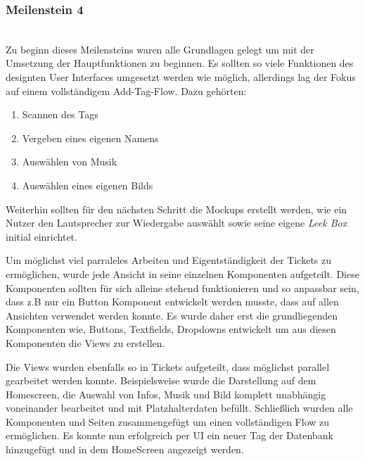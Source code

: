 \documentclass[10pt, a4paper]{article}
\begin{document}
\subsubsection*{Meilenstein 4} $~$ \\
Zu beginn dieses Meilensteins waren alle Grundlagen gelegt um mit der Umsetzung der Hauptfunktionen zu beginnen.
Es sollten so viele Funktionen des designten User Interfaces umgesetzt werden wie möglich, allerdings lag der Fokus auf einem vollständigem \glqq Add-Tag-Flow\grqq.
Dazu gehörten:
\begin{enumerate}
  \item Scannen des Tags
  \item Vergeben eines eigenen Namens
  \item Auswählen von Musik
  \item Auswählen eines eigenen Bilds
\end{enumerate}
Weiterhin sollten für den nächsten Schritt die Mockups erstellt werden, wie ein Nutzer den Lautsprecher zur Wiedergabe auswählt sowie seine eigene \textit{Leek Box} initial einrichtet.

Um möglichst viel parraleles Arbeiten und Eigentständigkeit der Tickets zu ermöglichen, wurde jede Ansicht in seine einzelnen Komponenten aufgeteilt.
Diese Komponenten sollten für sich alleine stehend funktionieren und so anpassbar sein, dass z.B nur ein Button Komponent entwickelt werden musste, dass auf
allen Ansichten verwendet werden konnte. Es wurde daher erst die grundliegenden Komponenten wie, Buttons, Textfields, Dropdowns entwickelt um aus diesen
Komponenten die Views zu erstellen.

Die Views wurden ebenfalls so in Tickets aufgeteilt, dass möglichst parallel gearbeitet werden konnte.
Beispielsweise wurde die Darstellung auf dem Homescreen, die Auswahl von Infos, Musik und Bild komplett unabhängig voneinander bearbeitet und mit Platzhalterdaten befüllt.
Schließlich wurden alle Komponenten und Seiten zusammengefügt um einen vollständigen Flow zu ermöglichen.
Es konnte nun erfolgreich per UI ein neuer Tag der Datenbank hinzugefügt und in dem HomeScreen angezeigt werden.
\end{document}
